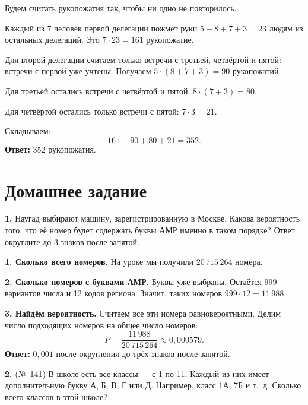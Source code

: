 \begin{solution}\label{solution-combinatorics-rules-problems-3}
Будем считать рукопожатия так, чтобы ни одно не повторилось.

Каждый из 7 человек первой делегации пожмёт руки $5+8+7+3=23$ людям из остальных делегаций. Это $7\cdot23=161$ рукопожатие.

Для второй делегации считаем только встречи с третьей, четвёртой и пятой: встречи с первой уже учтены. Получаем $5\cdot(8+7+3)=90$ рукопожатий.

Для третьей остались встречи с четвёртой и пятой: $8\cdot(7+3)=80$.

Для четвёртой остались только встречи с пятой: $7\cdot3=21$.

Складываем:
\[
161+90+80+21=352.
\]
\textbf{Ответ:} 352 рукопожатия.
\end{solution}

\section{Домашнее задание}

\begin{task}\label{task-homework-1}
\textbf{1.} Наугад выбирают машину, зарегистрированную в Москве. Какова вероятность того, что её номер будет содержать буквы АМР именно в таком порядке? Ответ округлите до 3 знаков после запятой.
\end{task}

\begin{solution}\label{solution-combinatorics-rules-homework-1}
\textbf{1. Сколько всего номеров.} На уроке мы получили $20\,715\,264$ номера.

\textbf{2. Сколько номеров с буквами АМР.} Буквы уже выбраны. Остаётся 999 вариантов числа и 12 кодов региона. Значит, таких номеров $999\cdot12=11\,988$.

\textbf{3. Найдём вероятность.} Считаем все эти номера равновероятными. Делим число подходящих номеров на общее число номеров:
\[
P=\frac{11\,988}{20\,715\,264}\approx0{,}000579.
\]
\textbf{Ответ:} $0{,}001$ после округления до трёх знаков после запятой.
\end{solution}

\begin{task}\label{task-homework-2}
\textbf{2.} (№ 141) В школе есть все классы — с 1 по 11. Каждый из них имеет дополнительную букву А, Б, В, Г или Д. Например, класс 1А, 7Б и т. д. Сколько всего классов в этой школе?
\end{task}

